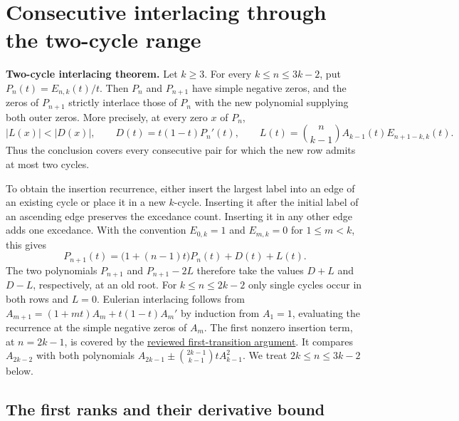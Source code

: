 \section{Consecutive interlacing through the two-cycle range}
\label{sec:two-cycle-insertion}

\textbf{Two-cycle interlacing theorem.}
Let $k\ge3$. For every $k\le n\le3k-2$, put $P_n(t)=E_{n,k}(t)/t$.
Then $P_n$ and $P_{n+1}$ have simple negative zeros, and the zeros of
$P_{n+1}$ strictly interlace those of $P_n$ with the new polynomial
supplying both outer zeros. More precisely, at every zero $x$ of $P_n$,
\begin{equation}
 \left|L(x)\right|<\left|D(x)\right|,\qquad
 D(t)=t(1-t)P_n'(t),\qquad
 L(t)=\binom{n}{k-1}A_{k-1}(t)E_{n+1-k,k}(t).
 \label{eq:two-cycle-lag}
\end{equation}
Thus the conclusion covers every consecutive pair for which the new row
admits at most two cycles.

To obtain the insertion recurrence, either insert the largest label
into an edge of an existing cycle or place it in a new $k$-cycle.
Inserting it after the initial label of an ascending edge preserves
the excedance count. Inserting it in any other edge adds one
excedance. With the convention $E_{0,k}=1$ and $E_{m,k}=0$ for
$1\le m<k$, this gives
\begin{equation}
 P_{n+1}(t)=\bigl(1+(n-1)t\bigr)P_n(t)+D(t)+L(t).
 \label{eq:two-cycle-recurrence}
\end{equation}
The two polynomials $P_{n+1}$ and $P_{n+1}-2L$ therefore take the values
$D+L$ and $D-L$, respectively, at an old root. For $k\le n\le2k-2$
only single cycles occur in both rows and $L=0$. Eulerian
interlacing follows from
$A_{m+1}=(1+mt)A_m+t(1-t)A_m'$ by induction from $A_1=1$,
evaluating the recurrence at the simple negative zeros of $A_m$.
The first nonzero insertion term, at $n=2k-1$, is covered by the
\href{https://github.com/ProgramComputer/open-math-research/pull/27}{reviewed first-transition argument}.
It compares $A_{2k-2}$ with both polynomials
$A_{2k-1}\pm\binom{2k-1}{k-1}tA_{k-1}^2$.
We treat $2k\le n\le3k-2$ below.

\subsection{The first ranks and their derivative bound}

